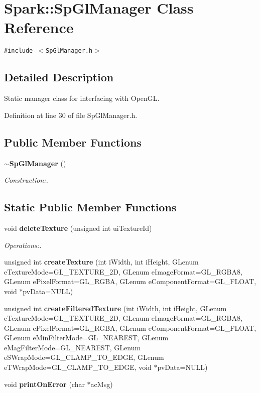 \section{Spark::Sp\-Gl\-Manager Class Reference}
\label{classSpark_1_1SpGlManager}
{\tt \#include $<$Sp\-Gl\-Manager.h$>$}



\subsection{Detailed Description}
Static manager class for interfacing with Open\-GL. 

Definition at line 30 of file Sp\-Gl\-Manager.h.\subsection*{Public Member Functions}
\begin{CompactItemize}
\item 
{\bf $\sim$Sp\-Gl\-Manager} ()
\begin{CompactList}\small\item\em Construction:. \item\end{CompactList}\end{CompactItemize}
\subsection*{Static Public Member Functions}
\begin{CompactItemize}
\item 
void {\bf delete\-Texture} (unsigned int ui\-Texture\-Id)
\begin{CompactList}\small\item\em Operations:. \item\end{CompactList}\item 
unsigned int {\bf create\-Texture} (int i\-Width, int i\-Height, GLenum e\-Texture\-Mode=GL\_\-TEXTURE\_\-2D, GLenum e\-Image\-Format=GL\_\-RGBA8, GLenum e\-Pixel\-Format=GL\_\-RGBA, GLenum e\-Component\-Format=GL\_\-FLOAT, void $\ast$pv\-Data=NULL)
\item 
unsigned int {\bf create\-Filtered\-Texture} (int i\-Width, int i\-Height, GLenum e\-Texture\-Mode=GL\_\-TEXTURE\_\-2D, GLenum e\-Image\-Format=GL\_\-RGBA8, GLenum e\-Pixel\-Format=GL\_\-RGBA, GLenum e\-Component\-Format=GL\_\-FLOAT, GLenum e\-Min\-Filter\-Mode=GL\_\-NEAREST, GLenum e\-Mag\-Filter\-Mode=GL\_\-NEAREST, GLenum e\-SWrap\-Mode=GL\_\-CLAMP\_\-TO\_\-EDGE, GLenum e\-TWrap\-Mode=GL\_\-CLAMP\_\-TO\_\-EDGE, void $\ast$pv\-Data=NULL)
\item 
void {\bf print\-On\-Error} (char $\ast$ac\-Msg)
\end{CompactItemize}


